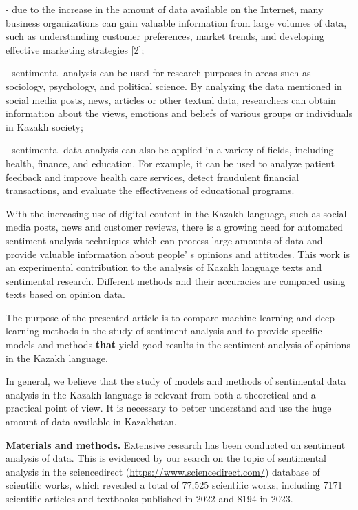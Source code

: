 - due to the increase in the amount of data available on the Internet,
many business organizations can gain valuable information from large
volumes of data, such as understanding customer preferences, market
trends, and developing effective marketing strategies {[}2{]};

- sentimental analysis can be used for research purposes in areas such
as sociology, psychology, and political science. By analyzing the data
mentioned in social media posts, news, articles or other textual data,
researchers can obtain information about the views, emotions and beliefs
of various groups or individuals in Kazakh society;

- sentimental data analysis can also be applied in a variety of fields,
including health, finance, and education. For example, it can be used to
analyze patient feedback and improve health care services, detect
fraudulent financial transactions, and evaluate the effectiveness of
educational programs.

With the increasing use of digital content in the Kazakh language, such
as social media posts, news and customer reviews, there is a growing
need for automated sentiment analysis techniques which can process large
amounts of data and provide valuable information about
people' s opinions and attitudes. This work is an
experimental contribution to the analysis of Kazakh language texts and
sentimental research. Different methods and their accuracies are
compared using texts based on opinion data.

The purpose of the presented article is to compare machine learning and
deep learning methods in the study of sentiment analysis and to provide
specific models and methods {\bfseries that} yield good results in the
sentiment analysis of opinions in the Kazakh language.

In general, we believe that the study of models and methods of
sentimental data analysis in the Kazakh language is relevant from both a
theoretical and a practical point of view. It is necessary to better
understand and use the huge amount of data available in Kazakhstan.

{\bfseries Materials and methods.} Extensive research has been conducted on
sentiment analysis of data. This is evidenced by our search on the topic
of sentimental analysis in the sciencedirect
(\url{https://www.sciencedirect.com/}) database of scientific works,
which revealed a total of 77,525 scientific works, including 7171
scientific articles and textbooks published in 2022 and 8194 in 2023.

